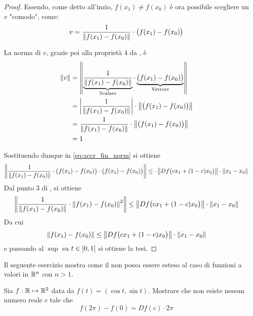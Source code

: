 \begin{theorem}
\begin{proof}
		Essendo, come detto all'inzio, $f(x_1) \neq f(x_0)$ è ora possibile scegliere un $v$ "comodo", come:
		\[v = \frac{1}{\left\|f(x_1) - f(x_0)\right\|} \cdot \bigl( f(x_1) - f(x_0) \bigr)\]
		\begin{note}
			La norma di $v$, grazie poi alla proprietà 4 da , è
			\begin{align*}
				\left\|v\right\| &= \left\|
					\underbrace{\frac{1}{\left\|f(x_1) - f(x_0)\right\|}}_{\text{Scalare}}
					\cdot
					\underbrace{\bigl( f(x_1) - f(x_0) \bigr)}_{\text{Vettore}}
					\right\|\\
				&= \left|\frac{1}{\left\|f(x_1) - f(x_0)\right\|}\right| \cdot \left\|\bigl( f(x_1) - f(x_0) \bigr)\right\|\\
				&= \frac{1}{\left\|f(x_1) - f(x_0)\right\|} \cdot \left\|\bigl( f(x_1) - f(x_0) \bigr)\right\|\\
				&= 1
			\end{align*}
		\end{note}
		Sostituendo dunque in \cref{eq:accr_fin_norm} si ottiene
		\[\left\|\frac{1}{\left\|f(x_1) - f(x_0)\right\|} \cdot \bigl( f(x_1) - f(x_0) \bigr) \cdot \bigl( f(x_1) - f(x_0) \bigr)\right\| \leq \cdot \left\|Df\bigl( cx_1 + (1-c)x_0 \bigr)\right\| \cdot \left\|x_1 - x_0\right\|\]
		Dal punto 3 di , si ottiene
		\[\left\|\frac{1}{\left\|f(x_1) - f(x_0)\right\|} \cdot \left\|f(x_1) - f(x_0)\right\|^2\right\| \leq \left\|Df\bigl( cx_1 + (1-c)x_0 \bigr)\right\| \cdot \left\|x_1 - x_0\right\|\]
		Da cui
		\[\left\|f(x_1) - f(x_0)\right\| \leq \left\|Df\bigl( cx_1 + (1-c)x_0 \bigr)\right\| \cdot \left\|x_1 - x_0\right\|\]
		e passando al $\sup$ su $t \in \left]0,1\right[$ si ottiene la tesi.
	\end{proof}
\end{theorem}
Il seguente esercizio mostra come il  non possa essere esteso al caso di funzioni a valori in $\mathbb{R}^n$ con $n > 1$.
\begin{exercise}
	Sia $f: \mathbb{R} \mapsto \mathbb{R}^2$ data da $f(t) = (\cos t, \sin t)$. Mostrare che non esiste nessun numero reale $c$ tale che
	\[f(2 \pi) - f(0) = Df(c) \cdot 2 \pi\]
\end{exercise}

